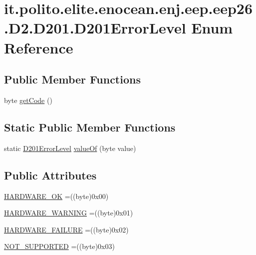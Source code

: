 \hypertarget{enumit_1_1polito_1_1elite_1_1enocean_1_1enj_1_1eep_1_1eep26_1_1_d2_1_1_d201_1_1_d201_error_level}{}\section{it.\+polito.\+elite.\+enocean.\+enj.\+eep.\+eep26.\+D2.\+D201.\+D201\+Error\+Level Enum Reference}
\label{enumit_1_1polito_1_1elite_1_1enocean_1_1enj_1_1eep_1_1eep26_1_1_d2_1_1_d201_1_1_d201_error_level}
\subsection*{Public Member Functions}
\begin{DoxyCompactItemize}
\item 
byte \hyperlink{enumit_1_1polito_1_1elite_1_1enocean_1_1enj_1_1eep_1_1eep26_1_1_d2_1_1_d201_1_1_d201_error_level_a43641622ad7d20b71d7538c94daa4bc9}{get\+Code} ()
\end{DoxyCompactItemize}
\subsection*{Static Public Member Functions}
\begin{DoxyCompactItemize}
\item 
static \hyperlink{enumit_1_1polito_1_1elite_1_1enocean_1_1enj_1_1eep_1_1eep26_1_1_d2_1_1_d201_1_1_d201_error_level}{D201\+Error\+Level} \hyperlink{enumit_1_1polito_1_1elite_1_1enocean_1_1enj_1_1eep_1_1eep26_1_1_d2_1_1_d201_1_1_d201_error_level_af6754b3c2a85186d63f682ba05e0258d}{value\+Of} (byte value)
\end{DoxyCompactItemize}
\subsection*{Public Attributes}
\begin{DoxyCompactItemize}
\item 
\hyperlink{enumit_1_1polito_1_1elite_1_1enocean_1_1enj_1_1eep_1_1eep26_1_1_d2_1_1_d201_1_1_d201_error_level_a583972c642a5928a9d9eba5949d6078e}{H\+A\+R\+D\+W\+A\+R\+E\+\_\+\+OK} =((byte)0x00)
\item 
\hyperlink{enumit_1_1polito_1_1elite_1_1enocean_1_1enj_1_1eep_1_1eep26_1_1_d2_1_1_d201_1_1_d201_error_level_a24d169e92ed3988724912bde80d7dbdd}{H\+A\+R\+D\+W\+A\+R\+E\+\_\+\+W\+A\+R\+N\+I\+NG} =((byte)0x01)
\item 
\hyperlink{enumit_1_1polito_1_1elite_1_1enocean_1_1enj_1_1eep_1_1eep26_1_1_d2_1_1_d201_1_1_d201_error_level_ad03de5c0802048713424cb23d1da6422}{H\+A\+R\+D\+W\+A\+R\+E\+\_\+\+F\+A\+I\+L\+U\+RE} =((byte)0x02)
\item 
\hyperlink{enumit_1_1polito_1_1elite_1_1enocean_1_1enj_1_1eep_1_1eep26_1_1_d2_1_1_d201_1_1_d201_error_level_a9a1f85eb6fdb49d0d976d6a05218e8e2}{N\+O\+T\+\_\+\+S\+U\+P\+P\+O\+R\+T\+ED} =((byte)0x03)
\end{DoxyCompactItemize}


